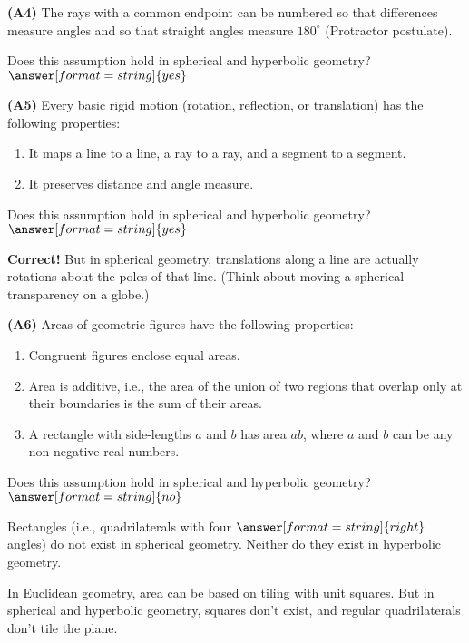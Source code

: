 \documentclass[nooutcomes]{ximera}
\begin{document}
\begin{problem}
\textbf{(A4)} The rays with a common endpoint can be numbered so that differences measure angles and so that straight angles measure $180^\circ$ (Protractor postulate). 

Does this assumption hold in spherical and hyperbolic geometry? 
$\answer[format=string]{yes}$
\end{problem}

\begin{problem}
\textbf{(A5)} Every basic rigid motion (rotation, reflection, or translation) has the following properties:
\begin{enumerate}
\item It maps a line to a line, a ray to a ray, and a segment to a segment.
\item It preserves distance and angle measure.
\end{enumerate}

Does this assumption hold in spherical and hyperbolic geometry? 
$\answer[format=string]{yes}$
\begin{feedback}[correct]
\textbf{Correct!} But in spherical geometry, translations along a line are actually rotations about the poles of that line.  (Think about moving a spherical transparency on a globe.) 
\end{feedback}
\end{problem}

\begin{problem}
\textbf{(A6)} Areas of geometric figures have the following properties: 
\begin{enumerate}
\item Congruent figures enclose equal areas.
\item Area is additive, i.e., the area of the union of two regions that overlap only at their boundaries is the sum of their areas. 
\item A rectangle with side-lengths $a$ and $b$ has area $ab$, where $a$ and $b$ can be any non-negative real numbers.
\end{enumerate}

Does this assumption hold in spherical and hyperbolic geometry? 
$\answer[format=string]{no}$
\begin{problem}
Rectangles (i.e., quadrilaterals with four $\answer[format=string]{right}$ angles) do not exist in spherical geometry.  Neither do they exist in hyperbolic geometry.  

In Euclidean geometry, area can be based on tiling with unit squares.  But in spherical and hyperbolic geometry, squares don't exist, and regular quadrilaterals don't tile the plane.
\end{problem}
\end{problem}
\end{document}

